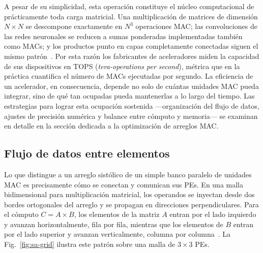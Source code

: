 \documentclass[conference]{IEEEtran}
\begin{document}
A pesar de su simplicidad, esta operación constituye el núcleo computacional de prácticamente toda carga matricial. Una multiplicación de matrices de dimensión $N \times N$ se descompone exactamente en $N^3$ operaciones MAC; las convoluciones de las redes neuronales se reducen a sumas ponderadas implementadas también como MACs; y los productos punto en capas completamente conectadas siguen el mismo patrón~\cite{liao2025nn}. Por esta razón los fabricantes de aceleradores miden la capacidad de sus dispositivos en TOPS (\textit{tera-operations per second}), métrica que en la práctica cuantifica el número de MACs ejecutadas por segundo. La eficiencia de un acelerador, en consecuencia, depende no solo de cuántas unidades MAC pueda integrar, sino de qué tan ocupadas pueda mantenerlas a lo largo del tiempo. Las estrategias para lograr esta ocupación sostenida ---organización del flujo de datos, ajustes de precisión numérica y balance entre cómputo y memoria--- se examinan en detalle en la sección dedicada a la optimización de arreglos MAC.

\subsection{Flujo de datos entre elementos}

Lo que distingue a un arreglo sistólico de un simple banco paralelo de unidades MAC es precisamente cómo se conectan y comunican sus PEs. En una malla bidimensional para multiplicación matricial, los operandos se inyectan desde dos bordes ortogonales del arreglo y se propagan en direcciones perpendiculares. Para el cómputo $C = A \times B$, los elementos de la matriz $A$ entran por el lado izquierdo y avanzan horizontalmente, fila por fila, mientras que los elementos de $B$ entran por el lado superior y avanzan verticalmente, columna por columna~\cite{puscasu2024sa}. La Fig.~\ref{fig:sa-grid} ilustra este patrón sobre una malla de $3\times 3$ PEs.
\end{document}
